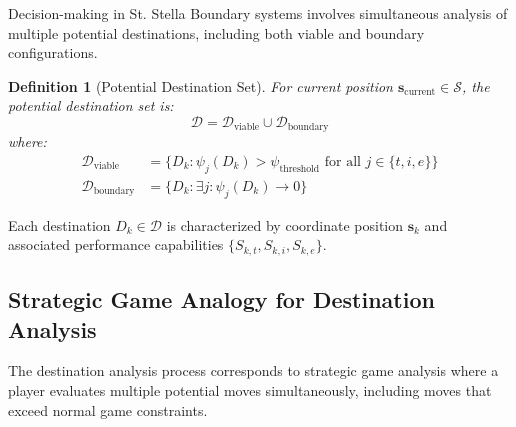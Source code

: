 \documentclass[12pt,a4paper]{article}
\newtheorem{definition}{Definition}
\begin{document}
Decision-making in St. Stella Boundary systems involves simultaneous analysis of multiple potential destinations, including both viable and boundary configurations.

\begin{definition}[Potential Destination Set]
For current position $\mathbf{s}_{\text{current}} \in \mathcal{S}$, the potential destination set is:
\begin{equation}
\mathcal{D} = \mathcal{D}_{\text{viable}} \cup \mathcal{D}_{\text{boundary}}
\end{equation}
where:
\begin{align}
\mathcal{D}_{\text{viable}} &= \{D_k : \psi_j(D_k) > \psi_{\text{threshold}} \text{ for all } j \in \{t,i,e\}\} \\
\mathcal{D}_{\text{boundary}} &= \{D_k : \exists j : \psi_j(D_k) \to 0\}
\end{align}
\end{definition}

Each destination $D_k \in \mathcal{D}$ is characterized by coordinate position $\mathbf{s}_k$ and associated performance capabilities $\{S_{k,t}, S_{k,i}, S_{k,e}\}$.

\subsection{Strategic Game Analogy for Destination Analysis}

The destination analysis process corresponds to strategic game analysis where a player evaluates multiple potential moves simultaneously, including moves that exceed normal game constraints.
\end{document}
